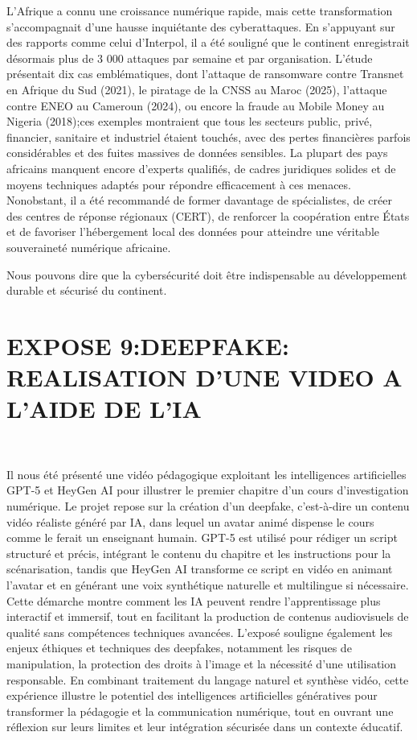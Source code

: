 \documentclass[12pt,a4paper]{report}
\begin{document}
{ 
  L’Afrique a connu une croissance numérique rapide, mais cette transformation s’accompagnait d’une hausse inquiétante des cyberattaques. En s’appuyant sur des rapports comme celui d’Interpol, il a été souligné que le continent enregistrait désormais plus de 3 000 attaques par semaine et par organisation. L’étude présentait  dix cas emblématiques, dont l’attaque de ransomware contre Transnet en Afrique du Sud (2021), le piratage de la CNSS au Maroc (2025), l’attaque contre ENEO au Cameroun (2024), ou encore la fraude au Mobile Money au Nigeria (2018);ces exemples montraient que tous les secteurs public, privé, financier, sanitaire et industriel étaient touchés, avec des pertes financières parfois considérables et des fuites massives de données sensibles. La plupart des pays africains manquent encore d’experts qualifiés, de cadres juridiques solides et de moyens techniques adaptés pour répondre efficacement à ces menaces. Nonobstant, il a été recommandé de former davantage de spécialistes, de créer des centres de réponse régionaux (CERT), de renforcer la coopération entre États et de favoriser l’hébergement local des données pour atteindre une véritable souveraineté numérique africaine. 
  \vspace*{0.4cm}\
  
 Nous pouvons dire que la cybersécurité doit être  indispensable au développement durable et sécurisé du continent.
 
  \section*{EXPOSE 9:DEEPFAKE: REALISATION D'UNE VIDEO A L'AIDE DE L'IA}\
 
 Il nous  été présenté une vidéo pédagogique exploitant les intelligences artificielles GPT-5 et HeyGen AI pour illustrer le premier chapitre d’un cours d’investigation numérique. Le projet repose sur la création d’un deepfake, c’est-à-dire un contenu vidéo réaliste généré par IA, dans lequel un avatar animé dispense le cours comme le ferait un enseignant humain. GPT-5 est utilisé pour rédiger un script structuré et précis, intégrant le contenu du chapitre et les instructions pour la scénarisation, tandis que HeyGen AI transforme ce script en vidéo en animant l’avatar et en générant une voix synthétique naturelle et multilingue si nécessaire. Cette démarche montre comment les IA peuvent rendre l’apprentissage plus interactif et immersif, tout en facilitant la production de contenus audiovisuels de qualité sans compétences techniques avancées. L’exposé souligne également les enjeux éthiques et techniques des deepfakes, notamment les risques de manipulation, la protection des droits à l’image et la nécessité d’une utilisation responsable. En combinant traitement du langage naturel et synthèse vidéo, cette expérience illustre le potentiel des intelligences artificielles génératives pour transformer la pédagogie et la communication numérique, tout en ouvrant une réflexion sur leurs limites et leur intégration sécurisée dans un contexte éducatif.
 
}
\end{document}
